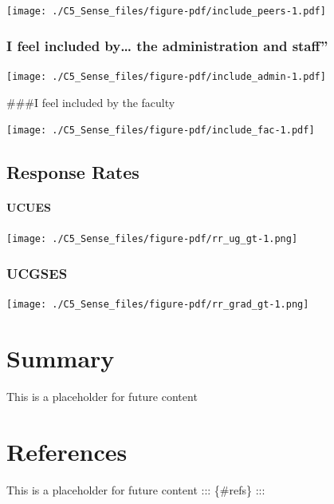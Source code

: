 \documentclass[
  letterpaper,
  DIV=11,
  numbers=noendperiod]{scrreprt}
\begin{document}
\texttt{[image: ./C5\_Sense\_files/figure-pdf/include\_peers-1.pdf]}

\hypertarget{i-feel-included-by-the-administration-and-staff}{%
\subsection{I feel included by\ldots{} the administration and
staff''}\label{i-feel-included-by-the-administration-and-staff}}

\texttt{[image: ./C5\_Sense\_files/figure-pdf/include\_admin-1.pdf]}

\#\#\#I feel included by the faculty

\texttt{[image: ./C5\_Sense\_files/figure-pdf/include\_fac-1.pdf]}

\hypertarget{response-rates-2}{%
\section{Response Rates}\label{response-rates-2}}

\hypertarget{ucues-2}{%
\subsubsection{UCUES}\label{ucues-2}}

\texttt{[image: ./C5\_Sense\_files/figure-pdf/rr\_ug\_gt-1.png]}

\hypertarget{ucgses-2}{%
\subsection{UCGSES}\label{ucgses-2}}

\texttt{[image: ./C5\_Sense\_files/figure-pdf/rr\_grad\_gt-1.png]}


\hypertarget{summary}{%
\chapter{Summary}\label{summary}}

This is a placeholder for future content


\hypertarget{references}{%
\chapter*{References}\label{references}}


This is a placeholder for future content ::: \{\#refs\} :::
\end{document}
